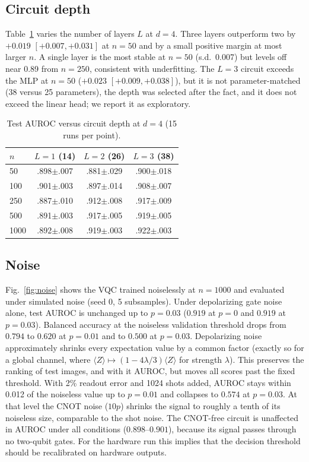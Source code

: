\documentclass[conference]{IEEEtran}
\begin{document}
\subsection{Circuit depth}
Table~\ref{tab:depth} varies the number of layers $L$ at $d=4$. Three
layers outperform two by $+0.019$ $[+0.007,+0.031]$ at $n=50$ and by a
small positive margin at most larger $n$. A single layer is the most
stable at $n=50$ (s.d.\ 0.007) but levels off near 0.89 from $n=250$,
consistent with underfitting. The $L=3$ circuit exceeds the MLP at $n=50$
($+0.023$ $[+0.009,+0.038]$), but it is not parameter-matched (38 versus
25 parameters), the depth was selected after the fact, and it does not
exceed the linear head; we report it as exploratory.

\begin{table}[t]
\centering
\caption{Test AUROC versus circuit depth at $d=4$ (15 runs per point).}
\label{tab:depth}
\footnotesize
\begin{tabular}{@{}lccc@{}}
\toprule
$n$ & $L=1$ (14) & $L=2$ (26) & $L=3$ (38) \\
\midrule
50   & .898$\pm$.007 & .881$\pm$.029 & .900$\pm$.018 \\
100  & .901$\pm$.003 & .897$\pm$.014 & .908$\pm$.007 \\
250  & .887$\pm$.010 & .912$\pm$.008 & .917$\pm$.009 \\
500  & .891$\pm$.003 & .917$\pm$.005 & .919$\pm$.005 \\
1000 & .892$\pm$.008 & .919$\pm$.003 & .922$\pm$.003 \\
\bottomrule
\end{tabular}
\end{table}

\subsection{Noise}
Fig.~\ref{fig:noise} shows the VQC trained noiselessly at $n=1000$ and
evaluated under simulated noise (seed 0, 5 subsamples). Under depolarizing
gate noise alone, test AUROC is unchanged up to $p=0.03$ ($0.919$ at $p=0$
and $0.919$ at $p=0.03$). Balanced accuracy at the noiseless validation
threshold drops from $0.794$ to $0.620$ at $p=0.01$ and to $0.500$ at
$p=0.03$. Depolarizing noise approximately shrinks every expectation
value by a common factor (exactly so for a global channel, where
$\langle Z\rangle\mapsto(1-4\lambda/3)\langle Z\rangle$ for strength
$\lambda$). This preserves the ranking of test images,
and with it AUROC, but moves all scores past the fixed threshold. With 2\%
readout error and 1024 shots added, AUROC stays within 0.012 of the
noiseless value up to $p=0.01$ and collapses to $0.574$ at $p=0.03$. At
that level the CNOT noise ($10p$) shrinks the signal to roughly a tenth of
its noiseless size, comparable to the shot noise. The CNOT-free circuit is
unaffected in AUROC under all conditions ($0.898$--$0.901$), because its
signal passes through no two-qubit gates. For the hardware run this
implies that the decision threshold should be recalibrated on hardware
outputs.
\end{document}
